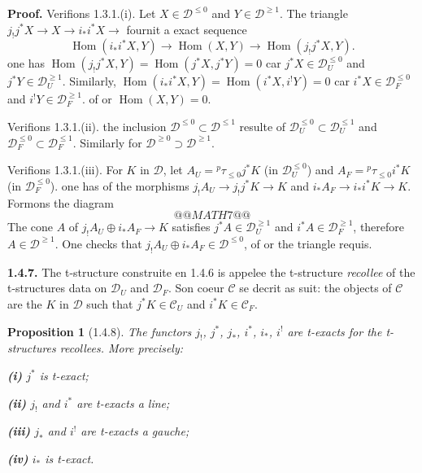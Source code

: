 \documentclass[12pt,a4paper]{article}
\theoremstyle{plain}
\newtheorem{proposition}[theorem]{Proposition}
\theoremstyle{definition}
\theoremstyle{remark}
\DeclareMathOperator{\Hom}{Hom}
\newcommand{\cC}{\mathcal{C}}
\newcommand{\cD}{\mathcal{D}}
\begin{document}
\noindent
\textbf{Proof.} Verifions 1.3.1.(i). Let $X \in \cD^{\leq 0}$ and $Y \in \cD^{\geq 1}$. The triangle $j_{!}j^{*}X \to X \to i_{*}i^{*}X \to$ fournit a exact sequence
\[
\Hom(i_{*}i^{*}X, Y) \to \Hom(X, Y) \to \Hom(j_{!}j^{*}X, Y).
\]
one has $\Hom(j_{!}j^{*}X, Y) = \Hom(j^{*}X, j^{*}Y) = 0$ car $j^{*}X \in \cD_{U}^{\leq 0}$ and $j^{*}Y \in \cD_{U}^{\geq 1}$. Similarly, $\Hom(i_{*}i^{*}X, Y) = \Hom(i^{*}X, i^{!}Y) = 0$ car $i^{*}X \in \cD_{F}^{\leq 0}$ and $i^{!}Y \in \cD_{F}^{\geq 1}$. of or $\Hom(X, Y) = 0$.

Verifions 1.3.1.(ii). the inclusion $\cD^{\leq 0} \subset \cD^{\leq 1}$ resulte of $\cD_{U}^{\leq 0} \subset \cD_{U}^{\leq 1}$ and $\cD_{F}^{\leq 0} \subset \cD_{F}^{\leq 1}$. Similarly for $\cD^{\geq 0} \supset \cD^{\geq 1}$.

Verifions 1.3.1.(iii). For $K$ in $\cD$, let $A_{U} = {}^{p}\tau_{\leq 0}j^{*}K$ (in $\cD_{U}^{\leq 0}$) and $A_{F} = {}^{p}\tau_{\leq 0}i^{*}K$ (in $\cD_{F}^{\leq 0}$). one has of the morphisms $j_{!}A_{U} \to j_{!}j^{*}K \to K$ and $i_{*}A_{F} \to i_{*}i^{*}K \to K$. Formons the diagram
\[
@@MATH7@@
\]
The cone $A$ of $j_{!}A_{U} \oplus i_{*}A_{F} \to K$ satisfies $j^{*}A \in \cD_{U}^{\geq 1}$ and $i^{*}A \in \cD_{F}^{\geq 1}$, therefore $A \in \cD^{\geq 1}$. One checks that $j_{!}A_{U} \oplus i_{*}A_{F} \in \cD^{\leq 0}$, of or the triangle requis.

\smallskip

\noindent
\textbf{1.4.7.} The t-structure construite en 1.4.6 is appelee the t-structure \emph{recollee} of the t-structures data on $\cD_{U}$ and $\cD_{F}$. Son coeur $\cC$ se decrit as suit: the objects of $\cC$ are the $K$ in $\cD$ such that $j^{*}K \in \cC_{U}$ and $i^{*}K \in \cC_{F}$.

\smallskip

\begin{proposition}[1.4.8]
The functors $j_{!}$, $j^{*}$, $j_{*}$, $i^{*}$, $i_{*}$, $i^{!}$ are t-exacts for the t-structures recollees. More precisely:

\smallskip

\noindent
\textbf{(i)} $j^{*}$ is t-exact;

\noindent
\textbf{(ii)} $j_{!}$ and $i^{*}$ are t-exacts a line;

\noindent
\textbf{(iii)} $j_{*}$ and $i^{!}$ are t-exacts a gauche;

\noindent
\textbf{(iv)} $i_{*}$ is t-exact.
\end{proposition}

\smallskip
\end{document}
